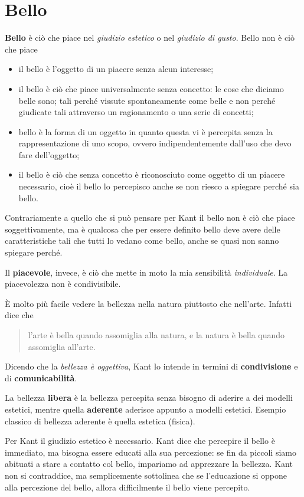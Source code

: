 \documentclass[a4paper, twoside, titlepage]{book}
\newcommand{\citazione}[1]{%
  \begin{quotation}
  #1
  \end{quotation}}
\begin{document}
\section{Bello}

\textbf{Bello} è ciò che piace nel \textit{giudizio estetico} o nel \textit{giudizio di gusto}. Bello non è ciò che piace
\begin{itemize}
\item il bello è l'oggetto di un piacere senza alcun interesse;
\item il bello è ciò che piace universalmente senza concetto: le cose che diciamo belle sono; tali perché vissute spontaneamente come belle e non perché giudicate tali attraverso un ragionamento o una serie di concetti;
\item bello è la forma di un oggetto in quanto questa vi è percepita senza la rappresentazione di uno scopo, ovvero indipendentemente dall'uso che devo fare dell'oggetto;
\item il bello è ciò che senza concetto è riconosciuto come oggetto di un piacere necessario, cioè il bello lo percepisco anche se non riesco a spiegare perché sia bello.
\end{itemize}

Contrariamente a quello che si può pensare per Kant il bello non è ciò che piace soggettivamente, ma è qualcosa che per essere definito bello deve avere delle caratteristiche tali che tutti lo vedano come bello, anche se quasi non sanno spiegare perché.

Il \textbf{piacevole}, invece, è ciò che mette in moto la mia sensibilità \textit{individuale}. La piacevolezza non è condivisibile.

È molto più facile vedere la bellezza nella natura piuttosto che nell'arte. Infatti dice che
\citazione{l'arte è bella quando assomiglia alla natura, e la natura è bella quando assomiglia all'arte.}

Dicendo che la \textit{bellezza è oggettiva}, Kant lo intende in termini di \textbf{condivisione} e di \textbf{comunicabilità}.

La bellezza \textbf{libera} è la bellezza percepita senza bisogno di aderire a dei modelli estetici, mentre quella \textbf{aderente} aderisce appunto a modelli estetici. Esempio classico di bellezza aderente è quella estetica (fisica).

Per Kant il giudizio estetico è necessario. Kant dice che percepire il bello è immediato, ma bisogna essere educati alla sua percezione: se fin da piccoli siamo abituati a stare a contatto col bello, impariamo ad apprezzare la bellezza. Kant non si contraddice, ma semplicemente sottolinea che se l'educazione si oppone alla percezione del bello, allora difficilmente il bello viene percepito.
\end{document}
